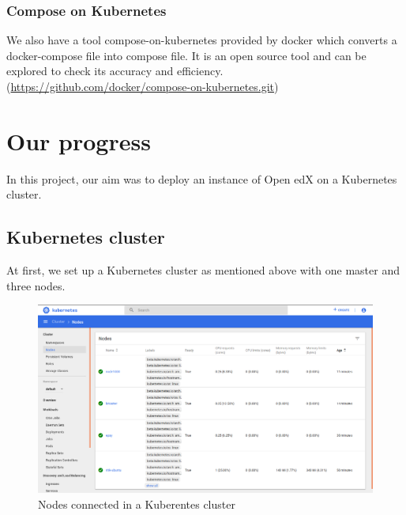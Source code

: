 \documentclass[12pt]{article}
\begin{document}
\subsubsection{Compose on Kubernetes}
We also have a tool compose-on-kubernetes provided by docker which converts a docker-compose file into compose file. It is an open source tool and can be explored to check its accuracy and efficiency.(\href{https://github.com/docker/compose-on-kubernetes.git}{https://github.com/docker/compose-on-kubernetes.git})
\section{Our progress}
In this project, our aim was to deploy an instance of Open edX on a Kubernetes cluster.
\subsection{Kubernetes cluster}
At first, we set up a Kubernetes cluster as mentioned above with one master and three nodes.
\begin{figure}[h!]
	\begin{center}
		\includegraphics[totalheight=0.4\textheight]{cluster}
		\caption{Nodes connected in a Kuberentes cluster}
	\end{center}
\end{figure}
\\\\\\\\\\\\\\\\\\\\
\end{document}
